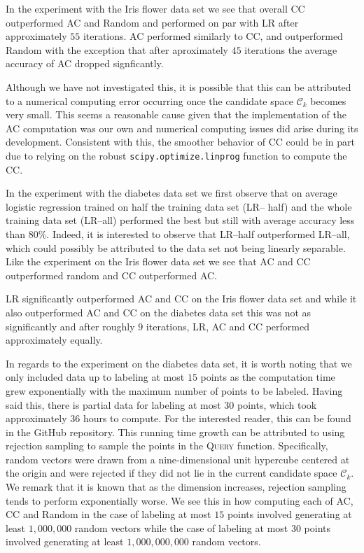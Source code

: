 \documentclass[11pt]{amsart}
\theoremstyle{definition}
\theoremstyle{remark}
\begin{document}
        In the experiment with the Iris flower data set we see that overall CC outperformed AC and Random and performed on par with LR after approximately $55$ iterations. AC performed similarly to CC, and outperformed Random with the exception that after aproximately $45$ iterations the average accuracy of AC dropped signficantly. 

        Although we have not investigated this, it is possible that this can be attributed to a numerical computing error occurring once the candidate space $\mathcal{C}_k$ becomes very small. This seems a reasonable cause given that the implementation of the AC computation was our own and numerical computing issues did arise during its development. Consistent with this, the smoother behavior of CC could be in part due to relying on the robust \texttt{scipy.optimize.linprog} function to compute the CC. 

        In the experiment with the diabetes data set we first observe that on average logistic regression trained on half the training data set (LR-- half) and the whole training data set (LR--all) performed the best but still with average accuracy less than 80\%. Indeed, it is interested to observe that LR--half outperformed LR--all, which could possibly be attributed to the data set not being linearly separable. Like the experiment on the Iris flower data set we see that AC and CC outperformed random and CC outperformed AC.

        LR significantly outperformed AC and CC on the Iris flower data set and while it also outperformed AC and CC on the diabetes data set this was not as significantly and after roughly $9$ iterations, LR, AC and CC performed approximately equally. 

        In regards to the experiment on the diabetes data set, it is worth noting that we only included data up to labeling at most $15$ points as the computation time grew exponentially with the maximum number of points to be labeled. Having said this, there is partial data for labeling at most $30$ points, which took approximately $36$ hours to compute. For the interested reader, this can be found in the GitHub repository. This running time growth can be attributed to using rejection sampling to sample the points in the \textsc{Query} function. Specifically, random vectors were drawn from a nine-dimensional unit hypercube centered at the origin and were rejected if they did not lie in the current candidate space $\mathcal{C}_k$. We remark that it is known that as the dimension increases, rejection sampling tends to perform exponentially worse. We see this in how computing each of AC, CC and Random in the case of labeling at most $15$ points involved generating at least $1, 000, 000$ random vectors while the case of labeling at most $30$ points involved generating at least $1, 000, 000, 000$ random vectors.
\end{document}
